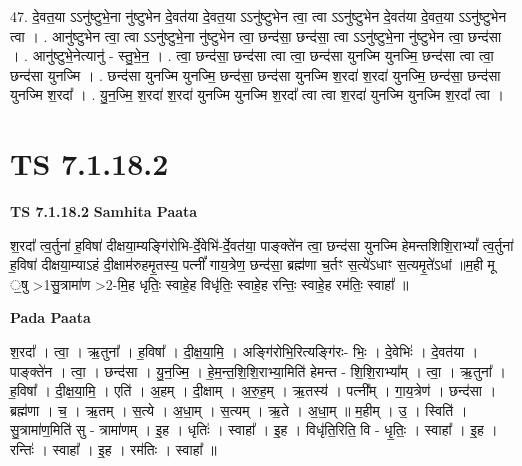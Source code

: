 \documentclass[17pt]{extarticle}
\begin{document}
47. दे॒वत॒या ऽऽनु॑ष्टुभे॒ना नु॑ष्टुभेन दे॒वत॑या दे॒वत॒या ऽऽनु॑ष्टुभेन त्वा॒ त्वा ऽऽनु॑ष्टुभेन दे॒वत॑या दे॒वत॒या ऽऽनु॑ष्टुभेन त्वा । . आनु॑ष्टुभेन त्वा॒ त्वा ऽऽनु॑ष्टुभे॒ना नु॑ष्टुभेन त्वा॒ छन्द॑सा॒ छन्द॑सा॒ त्वा ऽऽनु॑ष्टुभे॒ना नु॑ष्टुभेन त्वा॒ छन्द॑सा । . आनु॑ष्टुभे॒नेत्यानु॑ - स्तु॒भे॒न॒ । . त्वा॒ छन्द॑सा॒ छन्द॑सा त्वा त्वा॒ छन्द॑सा युनज्मि युनज्मि॒ छन्द॑सा त्वा त्वा॒ छन्द॑सा युनज्मि । . छन्द॑सा युनज्मि युनज्मि॒ छन्द॑सा॒ छन्द॑सा युनज्मि श॒रदा॑ श॒रदा॑ युनज्मि॒ छन्द॑सा॒ छन्द॑सा युनज्मि श॒रदा᳚ । . यु॒न॒ज्मि॒ श॒रदा॑ श॒रदा॑ युनज्मि युनज्मि श॒रदा᳚ त्वा त्वा श॒रदा॑ युनज्मि युनज्मि श॒रदा᳚ त्वा । \newline
\pagebreak
{}

\section{ TS 7.1.18.2 }

\textbf{TS 7.1.18.2 } \newline
\textbf{Samhita Paata} \newline

श॒रदा᳚ त्व॒र्तुना॑ ह॒विषा॑ दीक्षया॒म्यङ्गि॑रोभि-र्दे॒वेभि॑-र्दे॒वत॑या॒ पाङ्क्ते॑न त्वा॒ छन्द॑सा युनज्मि हेमन्तशिशि॒राभ्यां᳚ त्व॒र्तुना॑ ह॒विषा॑ दीक्षया॒म्याऽहं दी॒क्षाम॑रुहमृ॒तस्य॒ पत्नीं᳚ गाय॒त्रेण॒ छन्द॑सा॒ ब्रह्म॑णा च॒र्तꣳ स॒त्ये॑ऽधाꣳ स॒त्यमृ॒ते॑ऽधां ॥म॒ही मू ॒षु >1सु॒त्रामा॑ण >2-मि॒ह धृतिः॒ स्वाहे॒ह विधृ॑तिः॒ स्वाहे॒ह रन्तिः॒ स्वाहे॒ह रम॑तिः॒ स्वाहा᳚ ॥ \newline

\textbf{Pada Paata} \newline

श॒रदा᳚ । त्वा॒ । ऋ॒तुना᳚ । ह॒विषा᳚ । दी॒क्ष॒या॒मि॒ । अङ्गि॑रोभि॒रित्यङ्गि॑रः- भिः॒ । दे॒वेभिः॑ । दे॒वत॑या । पाङ्क्ते॑न । त्वा॒ । छन्द॑सा । यु॒न॒ज्मि॒ । हे॒म॒न्त॒शि॒शि॒राभ्या॒मिति॑ हेमन्त - शि॒शि॒राभ्या᳚म् । त्वा॒ । ऋ॒तुना᳚ । ह॒विषा᳚ । दी॒क्ष॒या॒मि॒ । एति॑ । अ॒हम् । दी॒क्षाम् । अ॒रु॒ह॒म् । ऋ॒तस्य॑ । पत्नी᳚म् । गा॒य॒त्रेण॑ । छन्द॑सा । ब्रह्म॑णा । च॒ । ऋ॒तम् । स॒त्ये । अ॒धा॒म् । स॒त्यम् । ऋ॒ते । अ॒धा॒म् ॥ म॒हीम् । उ॒ । स्विति॑ । सु॒त्रामा॑ण॒मिति॑ सु - त्रामा॑णम् । इ॒ह । धृतिः॑ । स्वाहा᳚ । इ॒ह । विधृ॑ति॒रिति॒ वि - धृ॒तिः॒ । स्वाहा᳚ । इ॒ह । रन्तिः॑ । स्वाहा᳚ । इ॒ह । रम॑तिः । स्वाहा᳚ ॥  \newline
\end{document}

